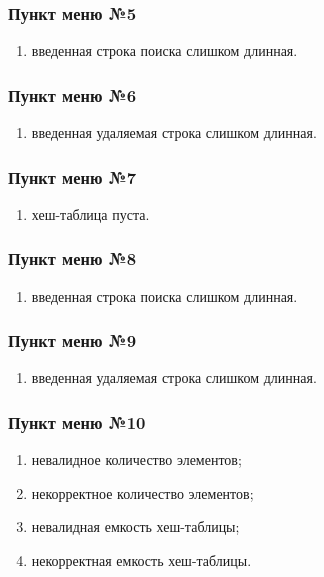 \documentclass[a4paper,12pt]{extarticle}
\begin{document}
\subsubsection{Пункт меню №5}
\begin{enumerate}
    \item введенная строка поиска слишком длинная.
\end{enumerate}

\subsubsection{Пункт меню №6}
\begin{enumerate}
    \item введенная удаляемая строка слишком длинная.
\end{enumerate}

\subsubsection{Пункт меню №7}
\begin{enumerate}
    \item хеш-таблица пуста.
\end{enumerate}

\subsubsection{Пункт меню №8}
\begin{enumerate}
    \item введенная строка поиска слишком длинная.
\end{enumerate}

\subsubsection{Пункт меню №9}
\begin{enumerate}
    \item введенная удаляемая строка слишком длинная.
\end{enumerate}

\subsubsection{Пункт меню №10}
\begin{enumerate}
    \item невалидное количество элементов;
    \item некорректное количество элементов;
    \item невалидная емкость хеш-таблицы;
    \item некорректная емкость хеш-таблицы.
\end{enumerate}
\end{document}
